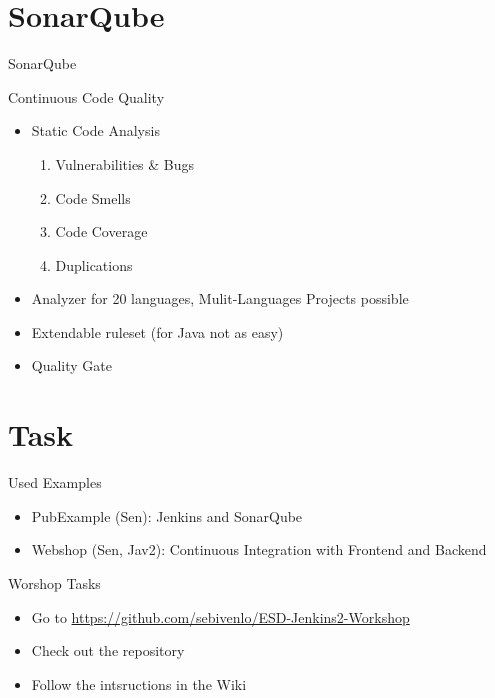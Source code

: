 \documentclass[utf8, a4paper]{beamer}
\begin{document}
\section{SonarQube}

\begin{frame}
	{SonarQube}

Continuous Code Quality
\begin{itemize}
	\item Static Code Analysis
		\begin{enumerate}
			\item Vulnerabilities \& Bugs			
			\item Code Smells
			\item Code Coverage
			\item Duplications
		\end{enumerate}
	\item Analyzer for 20 languages, Mulit-Languages Projects possible
	\item Extendable ruleset (for Java not as easy)
	\item Quality Gate
\end{itemize}

\end{frame}

\section{Task}

\begin{frame}
	{Used Examples}
	
	\begin{itemize}
		\item PubExample (Sen): Jenkins and SonarQube
		\item Webshop (Sen, Jav2): Continuous Integration with Frontend and Backend
	\end{itemize}		
	
\end{frame}

\begin{frame}
	{Worshop Tasks}
	
	\begin{itemize}
		\item Go to \url{https://github.com/sebivenlo/ESD-Jenkins2-Workshop}
		\item Check out the repository
		\item Follow the intsructions in the Wiki
	\end{itemize}

\end{frame}
\end{document}
